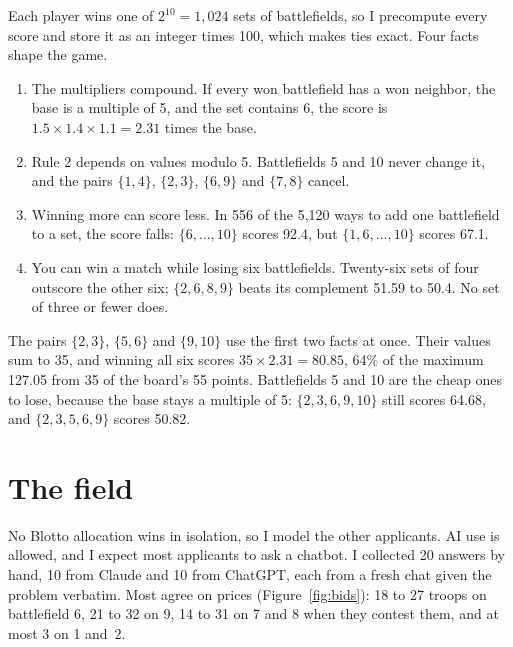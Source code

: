 \documentclass[10pt,a4paper,twocolumn]{article}
\begin{document}
Each player wins one of $2^{10} = 1{,}024$ sets of battlefields, so I precompute every score and store it as an integer times 100, which makes ties exact.
Four facts shape the game.
\begin{enumerate}
  \item The multipliers compound.
  If every won battlefield has a won neighbor, the base is a multiple of 5, and the set contains 6, the score is $1.5 \times 1.4 \times 1.1 = 2.31$ times the base.
  \item Rule 2 depends on values modulo 5.
  Battlefields 5 and 10 never change it, and the pairs $\{1,4\}$, $\{2,3\}$, $\{6,9\}$ and $\{7,8\}$ cancel.
  \item Winning more can score less.
  In 556 of the 5,120 ways to add one battlefield to a set, the score falls: $\{6,\dots,10\}$ scores 92.4, but $\{1,6,\dots,10\}$ scores 67.1.
  \item You can win a match while losing six battlefields.
  Twenty-six sets of four outscore the other six; $\{2,6,8,9\}$ beats its complement 51.59 to 50.4.
  No set of three or fewer does.
\end{enumerate}
The pairs $\{2,3\}$, $\{5,6\}$ and $\{9,10\}$ use the first two facts at once.
Their values sum to 35, and winning all six scores $35 \times 2.31 = 80.85$, 64\% of the maximum 127.05 from 35 of the board's 55 points.
Battlefields 5 and 10 are the cheap ones to lose, because the base stays a multiple of 5: $\{2,3,6,9,10\}$ still scores 64.68, and $\{2,3,5,6,9\}$ scores 50.82.

\section{The field}

No Blotto allocation wins in isolation, so I model the other applicants.
AI use is allowed, and I expect most applicants to ask a chatbot.
I collected 20 answers by hand, 10 from Claude and 10 from ChatGPT, each from a fresh chat given the problem verbatim.
Most agree on prices (Figure~\ref{fig:bids}): 18 to 27 troops on battlefield 6, 21 to 32 on 9, 14 to 31 on 7 and 8 when they contest them, and at most 3 on 1 and~2.
\end{document}
